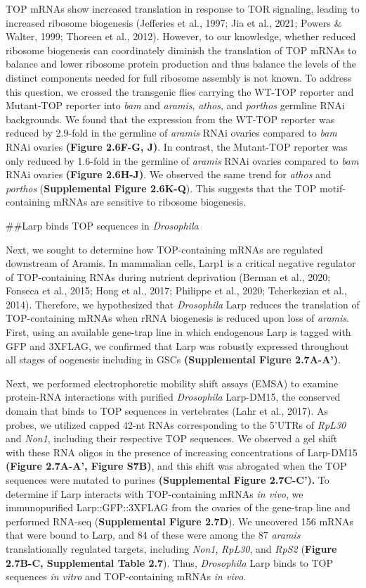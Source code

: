 \documentclass[12pt,twoside]{reedthesis}
\begin{document}
TOP mRNAs show increased translation in response to TOR signaling,
leading to increased ribosome biogenesis
(Jefferies et al., 1997; Jia et al., 2021; Powers \& Walter, 1999; Thoreen et al., 2012). However, to our knowledge,
whether reduced ribosome biogenesis can coordinately diminish the
translation of TOP mRNAs to balance and lower ribosome protein
production and thus balance the levels of the distinct components needed
for full ribosome assembly is not known. To address this question, we
crossed the transgenic flies carrying the WT-TOP reporter and Mutant-TOP
reporter into \emph{bam} and \emph{aramis}, \emph{athos}, and \emph{porthos} germline RNAi
backgrounds. We found that the expression from the WT-TOP reporter was
reduced by 2.9-fold in the germline of \emph{aramis} RNAi ovaries compared to
\emph{bam} RNAi ovaries \textbf{(Figure 2.6F-G, J)}. In contrast, the Mutant-TOP
reporter was only reduced by 1.6-fold in the germline of \emph{aramis} RNAi
ovaries compared to \emph{bam} RNAi ovaries \textbf{(Figure 2.6H-J)}. We observed
the same trend for \emph{athos} and \emph{porthos} (\textbf{Supplemental Figure 2.6K-Q}). This
suggests that the TOP motif-containing mRNAs are sensitive to ribosome
biogenesis.

\#\#Larp binds TOP sequences in \emph{Drosophila}

Next, we sought to determine how TOP-containing mRNAs are regulated
downstream of Aramis. In mammalian cells, Larp1 is a critical negative
regulator of TOP-containing RNAs during nutrient deprivation
(Berman et al., 2020; Fonseca et al., 2015; Hong et al., 2017; Philippe et al., 2020; Tcherkezian et al., 2014). Therefore, we
hypothesized that \emph{Drosophila} Larp reduces the translation of
TOP-containing mRNAs when rRNA biogenesis is reduced upon loss of
\emph{aramis}. First, using an available gene-trap line in which endogenous
Larp is tagged with GFP and 3XFLAG, we confirmed that Larp was robustly
expressed throughout all stages of oogenesis including in GSCs \textbf{(Supplemental Figure 2.7A-A')}.

Next, we performed electrophoretic mobility shift assays (EMSA) to
examine protein-RNA interactions with purified \emph{Drosophila} Larp-DM15,
the conserved domain that binds to TOP sequences in vertebrates
(Lahr et al., 2017). As probes, we utilized capped 42-nt RNAs corresponding
to the 5'UTRs of \emph{RpL30} and \emph{Non1}, including their respective TOP
sequences. We observed a gel shift with these RNA oligos in the presence
of increasing concentrations of Larp-DM15 \textbf{(Figure 2.7A-A', Figure
S7B)}, and this shift was abrogated when the TOP sequences were mutated
to purines \textbf{(Supplemental Figure 2.7C-C').} To determine if Larp interacts with
TOP-containing mRNAs \emph{in vivo}, we immunopurified Larp::GFP::3XFLAG from
the ovaries of the gene-trap line and performed RNA-seq (\textbf{Supplemental Figure 2.7D}). We uncovered 156 mRNAs that were bound to Larp, and 84 of these
were among the 87 \emph{aramis} translationally regulated targets, including
\emph{Non1}, \emph{RpL30}, and \emph{RpS2} (\textbf{Figure 2.7B-C, Supplemental Table 2.7}).
Thus, \emph{Drosophila} Larp binds to TOP sequences \emph{in vitro} and
TOP-containing mRNAs \emph{in vivo}.
\end{document}
